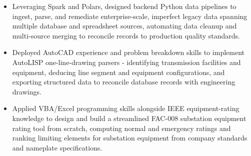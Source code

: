 \documentclass[10pt, letterpaper]{article}
\newenvironment{rlist}{%
  \begin{itemize}[leftmargin=1.4em, itemsep=1pt, topsep=2pt, parsep=0pt]%
}{%
  \end{itemize}%
}
\begin{document}
\begin{rlist}
  \item Leveraging Spark and Polars, designed backend Python data pipelines to ingest, parse, and remediate enterprise-scale, imperfect legacy data spanning multiple database and spreadsheet sources, automating data cleanup and multi-source merging to reconcile records to production quality standards.
  \item Deployed AutoCAD experience and problem breakdown skills to implement AutoLISP one-line-drawing parsers - identifying transmission facilities and equipment, deducing line segment and equipment configurations, and exporting structured data to reconcile database records with engineering drawings.
  \item Applied VBA/Excel programming skills alongside IEEE equipment-rating knowledge to design and build a streamlined FAC-008 substation equipment rating tool from scratch, computing normal and emergency ratings and ranking limiting elements for substation equipment from company standards and nameplate specifications.
\end{rlist}
\end{document}
